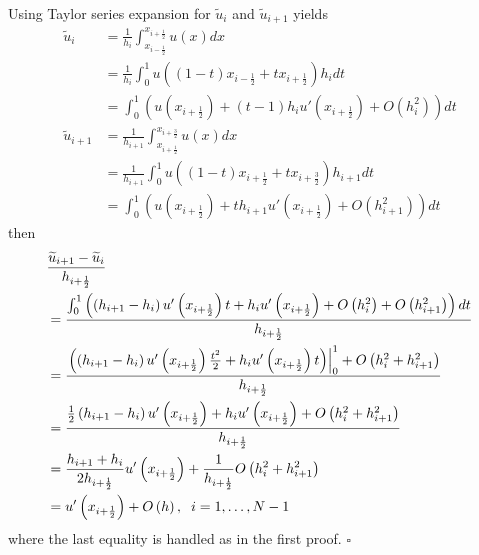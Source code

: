 \documentclass[a4paper]{article}
\numberwithin{equation}{section}
\begin{document}
Using Taylor series expansion for $\widetilde{u}_i$ and $\widetilde{u}_{i+1}$ yields
\begin{align}
{\widetilde u_i} &= \frac{1}{{{h_i}}}\int_{{x_{i - \frac{1}{2}}}}^{{x_{i + \frac{1}{2}}}} {u\left( x \right)dx} \\
 &= \frac{1}{{{h_i}}}\int_0^1 {u\left( {\left( {1 - t} \right){x_{i - \frac{1}{2}}} + t{x_{i + \frac{1}{2}}}} \right){h_i}dt} \\
 &= \int_0^1 {\left( {u\left( {{x_{i + \frac{1}{2}}}} \right) + \left( {t - 1} \right){h_i}u'\left( {{x_{i + \frac{1}{2}}}} \right) + O\left( {h_i^2} \right)} \right)dt} \\
{\widetilde u_{i + 1}} &= \frac{1}{{{h_{i + 1}}}}\int_{{x_{i + \frac{1}{2}}}}^{{x_{i + \frac{3}{2}}}} {u\left( x \right)dx} \\
 &= \frac{1}{{{h_{i + 1}}}}\int_0^1 {u\left( {\left( {1 - t} \right){x_{i + \frac{1}{2}}} + t{x_{i + \frac{3}{2}}}} \right){h_{i + 1}}dt} \\
 &= \int_0^1 {\left( {u\left( {{x_{i + \frac{1}{2}}}} \right) + t{h_{i + 1}}u'\left( {{x_{i + \frac{1}{2}}}} \right) + O\left( {h_{i + 1}^2} \right)} \right)dt} 
\end{align}
then
\begin{align}
&\frac{{{{\widetilde u}_{i + 1}} - {{\widetilde u}_i}}}{{{h_{i + \frac{1}{2}}}}} \\
&= \frac{{\int_0^1 {\left( {\left( {{h_{i + 1}} - {h_i}} \right)u'\left( {{x_{i + \frac{1}{2}}}} \right)t + {h_i}u'\left( {{x_{i + \frac{1}{2}}}} \right) + O\left( {h_i^2} \right) + O\left( {h_{i + 1}^2} \right)} \right)dt} }}{{{h_{i + \frac{1}{2}}}}}\\
& = \frac{{\left. {\left( {\left( {{h_{i + 1}} - {h_i}} \right)u'\left( {{x_{i + \frac{1}{2}}}} \right)\frac{{{t^2}}}{2} + {h_i}u'\left( {{x_{i + \frac{1}{2}}}} \right)t} \right)} \right|_0^1 + O\left( {h_i^2 + h_{i + 1}^2} \right)}}{{{h_{i + \frac{1}{2}}}}}\\
& = \frac{{\frac{1}{2}\left( {{h_{i + 1}} - {h_i}} \right)u'\left( {{x_{i + \frac{1}{2}}}} \right) + {h_i}u'\left( {{x_{i + \frac{1}{2}}}} \right) + O\left( {h_i^2 + h_{i + 1}^2} \right)}}{{{h_{i + \frac{1}{2}}}}}\\
& = \frac{{{h_{i + 1}} + {h_i}}}{{2{h_{i + \frac{1}{2}}}}}u'\left( {{x_{i + \frac{1}{2}}}} \right) + \frac{1}{{{h_{i + \frac{1}{2}}}}}O\left( {h_i^2 + h_{i + 1}^2} \right)\\
& = u'\left( {{x_{i + \frac{1}{2}}}} \right) + O\left( h \right),\hspace{0.2cm} i = 1, \ldots ,N-1
\end{align}
where the last equality is handled as in the first proof. \hfill $\square$\\
\end{document}
